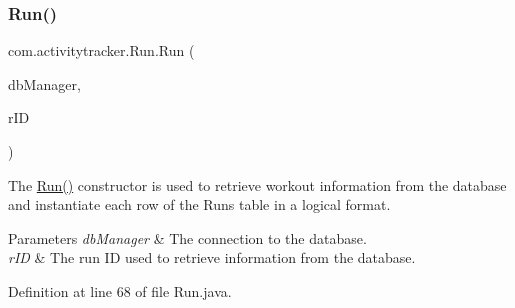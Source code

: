 \subsubsection{\texorpdfstring{Run()}{Run()}}
{\footnotesize\ttfamily com.\+activitytracker.\+Run.\+Run (\begin{DoxyParamCaption}\item[{final \mbox{\hyperlink{classcom_1_1activitytracker_1_1_d_b_manager}{D\+B\+Manager}}}]{db\+Manager,  }\item[{final int}]{r\+ID }\end{DoxyParamCaption})\hspace{0.3cm}{\ttfamily [package]}}

The \mbox{\hyperlink{classcom_1_1activitytracker_1_1_run_a5568c1c514835056d2abc22cfba222c5}{Run()}} constructor is used to retrieve workout information from the database and instantiate each row of the Runs table in a logical format.


\begin{DoxyParams}{Parameters}
{\em db\+Manager} & The connection to the database. \\
\hline
{\em r\+ID} & The run ID used to retrieve information from the database. \\
\hline
\end{DoxyParams}


Definition at line 68 of file Run.\+java.



